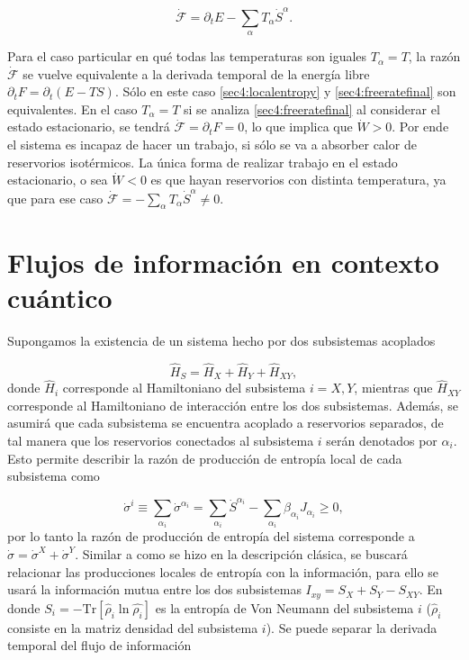 \begin{equation*}
    \dot{\mathcal{F}} = \partial_{t}E - \sum_{\alpha}T_{\alpha} \dot{S}^{\alpha}.
\end{equation*}

Para el caso particular en qué todas las temperaturas son iguales $T_{\alpha} = T$, la razón $\dot{\mathcal{F}}$ se vuelve equivalente a la derivada temporal de la energía libre $\partial_{t}F = \partial_{t}(E-TS)$. Sólo en este caso \ref{sec4:localentropy} y \ref{sec4:freeratefinal} son equivalentes. En el caso $T_{\alpha}=T$ si se analiza \ref{sec4:freeratefinal} al considerar el estado estacionario, se tendrá $\dot{\mathcal{F}} = \partial_{t}F = 0$, lo que implica que $\dot{W}>0$. Por ende el sistema es incapaz de hacer un trabajo, si sólo se va a absorber calor de reservorios isotérmicos. La única forma de realizar trabajo en el estado estacionario, o sea $\dot{W}<0$ es que hayan reservorios con distinta temperatura, ya que para ese caso $\dot{\mathcal{F}} = - \sum_{\alpha} T_{\alpha} \dot{S}^{\alpha} \neq 0$.   

\section{Flujos de información en contexto cuántico}
Supongamos la existencia de un sistema hecho por dos subsistemas acoplados

\begin{equation*}
    \hat{H}_{S} = \hat{H}_{X} + \hat{H}_{Y} + \hat{H}_{XY}, 
\end{equation*}
donde $\hat{H}_{i}$ corresponde al Hamiltoniano del subsistema $i=X,Y$, mientras que $\hat{H}_{XY}$ corresponde al Hamiltoniano de interacción entre los dos subsistemas. Además, se asumirá que cada subsistema se encuentra acoplado a reservorios separados, de tal manera que los reservorios conectados al subsistema $i$ serán denotados por $\alpha_{i}$. Esto permite describir la razón de producción de entropía local de cada subsistema como

\begin{equation*}
    \dot{\sigma}^{i} \equiv \sum_{\alpha_{i}} \dot{\sigma}^{\alpha_{i}} = \sum_{\alpha_{i}} \dot{S}^{\alpha_{i}} - \sum_{\alpha_{i}} \beta_{\alpha_{i}} J_{\alpha_{i}} \geq 0,
\end{equation*}
por lo tanto la razón de producción de entropía del sistema corresponde a $\dot{\sigma} = \dot{\sigma}^{X} + \dot{\sigma}^{Y}$. Similar a como se hizo en la descripción clásica, se buscará relacionar las producciones locales de entropía con la información, para ello se usará la información mutua entre los dos subsistemas $I_{xy} = S_{X} + S_{Y} - S_{XY}$. En donde $S_{i} = - \text{Tr}[ \hat{\rho}_{i}\ln \hat{\rho_{i}}]$ es la entropía de Von Neumann del subsistema $i$ ($\hat{\rho}_{i}$ consiste en la matriz densidad del subsistema $i$). Se puede separar la derivada temporal del flujo de información

